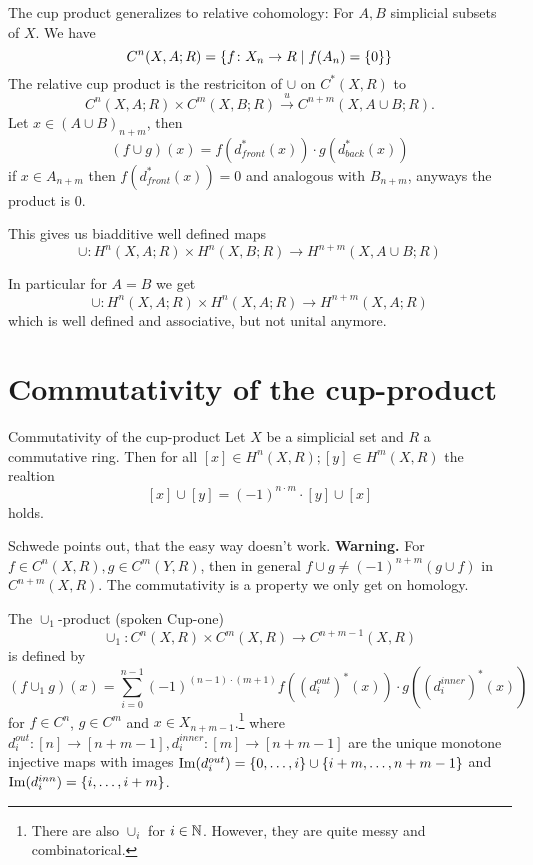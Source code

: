 \documentclass[language=english]{TemplateLecture}
\begin{document}
\begin{remark}
    The cup product generalizes to relative cohomology: For \(A, B\) simplicial subsets of \(X\). We have
    \[C^n(X,A;R) = \{f\colon X_n\to R \mid f(A_n) = \{0\}\}\]
    The relative cup product is the restriciton of \(\cup\) on \(C^*(X,R)\) to
    \[C^n(X,A;R) \times C^m(X,B;R) \xrightarrow{u} C^{n+m}(X,A\cup B;R).\]
    Let \(x \in (A \cup B)_{n+m}\), then
    \[(f\cup g)(x) = f(d_{front}^*(x)) \cdot g(d_{back}^*(x))\]
    if \(x \in A_{n+m}\) then \(f(d_{front}^*(x)) = 0\) and analogous with \(B_{n+m}\), anyways the product is 0.

    This gives us biadditive well defined maps
    \[\cup \colon H^n(X,A;R) \times H^n(X,B;R) \to H^{n+m}(X,A\cup B; R)\]

    In particular for \(A = B\) we get
    \[\cup\colon H^n(X,A;R) \times H^n(X,A;R) \to H^{n+m}(X,A;R)\]
    which is well defined and associative, but not unital anymore.
\end{remark}

\section{Commutativity of the cup-product}

\begin{thm}{Commutativity of the cup-product}{}
    Let \(X\) be a simplicial set and \(R\) a commutative ring. Then for all \([x] \in H^n(X,R); [y] \in H^m(X,R)\) the realtion
    \[[x] \cup [y] = (-1)^{n\cdot m} \cdot [y] \cup [x]\]
    holds.
\end{thm}

Schwede points out, that the easy way doesn't work.
\textbf{Warning.} For \(f \in C^n(X,R), g \in C^m(Y,R)\), then in general \(f\cup g \neq (-1)^{n+m} (g\cup f)\) in \(C^{n+m}(X,R)\). The commutativity is a property we only get on homology.


\begin{construction}
    The \(\cup_1\)-product (spoken Cup-one)
    \[\cup_1\colon C^n(X,R) \times C^m(X,R) \to C^{n+m-1}(X,R)\]
    is defined by
    \[(f\cup_1 g)(x) = \sum_{i =0}^{n-1} (-1)^{(n-1)\cdot (m+1)} f((d_i^{out})^*(x)) \cdot g((d_i^{inner})^*(x))\]
    for \(f\in C^n\), \(g \in C^m\) and \(x \in X_{n+m-1}\).\footnote{There are also \(\cup_i\) for \(i \in \mathbb{N}\). However, they are quite messy and combinatorical.}
    where \(d_i^{out}\colon [n] \to [n+m-1], d_i^{inner}\colon [m] \to [n+m-1]\) are the unique monotone injective maps with images \(\operatorname{Im}(d_i^{out}) = \{0, \dots, i\} \cup \{i+m, \dots, n+m-1\}\) and \(\operatorname{Im}(d_i^{inn}) = \{i, \dots, i+m\}\).
\end{construction}
\end{document}
